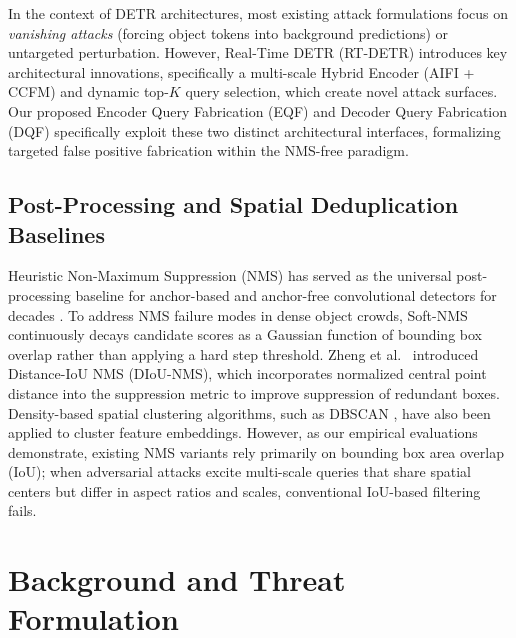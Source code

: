 \documentclass[preprint,12pt]{elsarticle}
\begin{document}
In the context of DETR architectures, most existing attack formulations focus on \textit{vanishing attacks} (forcing object tokens into background predictions) or untargeted perturbation. However, Real-Time DETR (RT-DETR) \citep{zhao2024detrs} introduces key architectural innovations, specifically a multi-scale Hybrid Encoder (AIFI + CCFM) and dynamic top-$K$ query selection, which create novel attack surfaces. Our proposed Encoder Query Fabrication (EQF) and Decoder Query Fabrication (DQF) specifically exploit these two distinct architectural interfaces, formalizing targeted false positive fabrication within the NMS-free paradigm.

\subsection{Post-Processing and Spatial Deduplication Baselines}
Heuristic Non-Maximum Suppression (NMS) has served as the universal post-processing baseline for anchor-based and anchor-free convolutional detectors for decades \citep{neubeck2006efficient}. To address NMS failure modes in dense object crowds, Soft-NMS \citep{bodla2017soft} continuously decays candidate scores as a Gaussian function of bounding box overlap rather than applying a hard step threshold. Zheng et al.\ \citep{zheng2020distance} introduced Distance-IoU NMS (DIoU-NMS), which incorporates normalized central point distance into the suppression metric to improve suppression of redundant boxes. Density-based spatial clustering algorithms, such as DBSCAN \citep{ester1996density}, have also been applied to cluster feature embeddings. However, as our empirical evaluations demonstrate, existing NMS variants rely primarily on bounding box area overlap (IoU); when adversarial attacks excite multi-scale queries that share spatial centers but differ in aspect ratios and scales, conventional IoU-based filtering fails.

\section{Background and Threat Formulation}
\label{sec:background}
\end{document}
